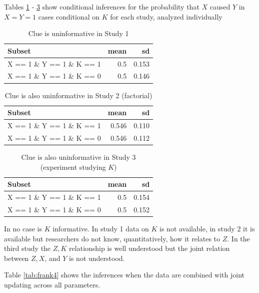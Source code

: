 \documentclass[12pt,]{book}
\begin{document}
Tables \ref{tab:frank1} - \ref{tab:frank3} show conditional inferences for the probability that \(X\) caused \(Y\) in \(X=Y=1\) cases conditional on \(K\) for each study, analyzed individually

\begin{table}[t]

\caption{\label{tab:frank1}Clue is uninformative in Study 1}
\centering
\begin{tabular}{l|r|r}
\hline
Subset & mean & sd\\
\hline
X == 1 \& Y == 1 \& K == 1 & 0.5 & 0.153\\
\hline
X == 1 \& Y == 1 \& K == 0 & 0.5 & 0.146\\
\hline
\end{tabular}
\end{table}

\begin{table}[t]

\caption{\label{tab:frank2}Clue is also uninformative in Study 2 (factorial)}
\centering
\begin{tabular}{l|r|r}
\hline
Subset & mean & sd\\
\hline
X == 1 \& Y == 1 \& K == 1 & 0.546 & 0.110\\
\hline
X == 1 \& Y == 1 \& K == 0 & 0.546 & 0.112\\
\hline
\end{tabular}
\end{table}

\begin{table}[t]

\caption{\label{tab:frank3}Clue is also uninformative in Study 3 (experiment studying $K$)}
\centering
\begin{tabular}{l|r|r}
\hline
Subset & mean & sd\\
\hline
X == 1 \& Y == 1 \& K == 1 & 0.5 & 0.154\\
\hline
X == 1 \& Y == 1 \& K == 0 & 0.5 & 0.152\\
\hline
\end{tabular}
\end{table}

In no case is \(K\) informative. In study 1 data on \(K\) is not available, in study 2 it is available but researchers do not know, quantitatively, how it relates to \(Z\). In the third study the \(Z,K\) relationship is well understood but the joint relation between \(Z,X\), and \(Y\) is not understood.

Table \ref{tab:frank4} shows the inferences when the data are combined with joint updating across all parameters.
\end{document}
